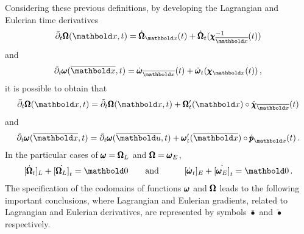 Considering these previous definitions, by developing the Lagrangian and Eulerian time derivatives 
\begin{equation}\label{eq:LagrTimeDerivative}
\bar{\partial}_t\tnr{\Omega}({\vto{x}},t)=\dot{\tnr{\Omega}}_{\vto{x}}(t)+\dot{\tnr{\Omega}}_{t}(\tnr{\chi}_{\overline{\vto{x}}}^{-1}(t))
\end{equation}
and
\begin{equation}\label{eq:EulerTimeDerivative}
\tilde{\partial}_t\tnr{\omega}(\overline{\vto{x}},t)=\dot{\tnr{\omega}}_{\overline{\vto{x}}}(t)+\dot{\tnr{\omega}}_{t}(\tnr{\chi}_{{\vto{x}}}(t))\,,
\end{equation}
it is possible to obtain that
\begin{equation}\label{eq:derivPartConst}
\bar{\partial}_t\tnr{\Omega}({\vto{x}},t)=\tilde{\partial}_t\tnr{\Omega}({\vto{x}},t)+\tnr{\Omega}_t'(\vto{x})\circ\dot{\tnr{\chi}}_{\overline{\vto{x}}}(t)
\end{equation}
and
\begin{equation}\label{eq:derivPlaceConst}
\tilde{\partial}_t\tnr{\omega}(\overline{\vto{x}},t)=\bar{\partial}_t\tnr{\omega}(\overline{\vto{u}},t)+\tnr{\omega}_t'(\overline{\vto{x}})\circ\dot{\tnr{p}}_{{\vto{x}}}(t)\,.
\end{equation}
In the particular cases of $\pmb{\omega}=\pmb{\Omega}_L$ and $\pmb{\Omega}=\pmb{\omega}_E$,
\begin{alignat}{3}\label{eq:zerosDescript} 
[\dot{\tnr{\Omega}}_{t}]_L+\dot{[\tnr{\Omega}_L]}_{t}=\vto{0}&\qquad \text{and}\qquad & [\dot{\tnr{\omega}}_{t}]_E+\dot{[\tnr{\omega}_E]}_{t}=\vto{0}\,.
\end{alignat}
The specification of the codomains of functions $\pmb{\omega}$ and $\pmb{\Omega}$ leads to the following important conclusions, where Lagrangian and Eulerian gradients, related to Lagrangian and Eulerian derivatives, are represented by symbols $\bar{\bullet}$ and $\tilde{\bullet}$ respectively.
